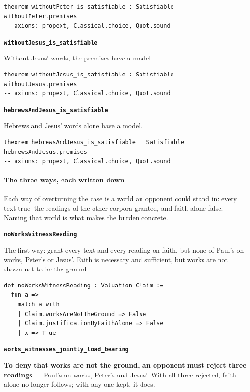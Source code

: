 \documentclass[11pt,paper=\testimonypaper,DIV=13,parskip=false]{scrartcl}
\begin{document}
{\small\begin{verbatim}
theorem withoutPeter_is_satisfiable : Satisfiable withoutPeter.premises
-- axioms: propext, Classical.choice, Quot.sound
\end{verbatim}}
\par\medskip\noindent\textbf{\texttt{without\allowbreak{}Jesus\_\allowbreak{}is\_\allowbreak{}satisfiable}}\par\nobreak\noindent
Without Jesus’ words, the premises have a model.

{\small\begin{verbatim}
theorem withoutJesus_is_satisfiable : Satisfiable withoutJesus.premises
-- axioms: propext, Classical.choice, Quot.sound
\end{verbatim}}
\par\medskip\noindent\textbf{\texttt{hebrews\allowbreak{}And\allowbreak{}Jesus\_\allowbreak{}is\_\allowbreak{}satisfiable}}\par\nobreak\noindent
Hebrews and Jesus’ words alone have a model.

{\small\begin{verbatim}
theorem hebrewsAndJesus_is_satisfiable : Satisfiable hebrewsAndJesus.premises
-- axioms: propext, Classical.choice, Quot.sound
\end{verbatim}}
\paragraph*{The three ways, each written down}
\leavevmode\par\nobreak
Each way of overturning the case is a world an opponent could stand in: every text true, the readings of the other corpora granted, and faith alone false. Naming that world is what makes the burden concrete.

\par\medskip\noindent\textbf{\texttt{no\allowbreak{}Works\allowbreak{}Witness\allowbreak{}Reading}}\par\nobreak\noindent
The first way: grant every text and every reading on faith, but none of Paul’s on works, Peter’s or Jesus’. Faith is necessary and sufficient, but works are not shown not to be the ground.

{\small\begin{verbatim}
def noWorksWitnessReading : Valuation Claim :=
  fun a =>
    match a with
    | Claim.worksAreNotTheGround => False
    | Claim.justificationByFaithAlone => False
    | x => True
\end{verbatim}}
\par\medskip\noindent\textbf{\texttt{works\_\allowbreak{}witnesses\_\allowbreak{}jointly\_\allowbreak{}load\_\allowbreak{}bearing}}\par\nobreak\noindent
\textbf{To deny that works are not the ground, an opponent must reject three readings} — Paul’s on works, Peter’s and Jesus’. With all three rejected, faith alone no longer follows; with any one kept, it does.
\end{document}
